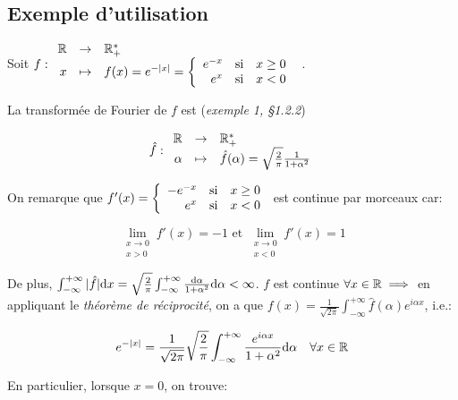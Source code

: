 \subsection{Exemple d'utilisation}

\begin{example}
    Soit $
    f:
    \begin{array}{r c l}
    \mathbb{R} & \rightarrow & \mathbb{R}_+^* \\
    x  & \mapsto & f(x) = e^{-|x|} =
    \left \{
    \begin{array}{r c l}
    e^{-x} & \textrm{si} & x \geq 0 \\
    e^x    & \textrm{si} & x < 0
    \end{array}
    \right.
    \end{array}
    $.
    
    La transformée de Fourier de $f$ est (\textit{exemple 1, §1.2.2})
    
    \[
    \hat{f}:
    \begin{array}{r c l}
    \mathbb{R} & \rightarrow & \mathbb{R}_+^* \\
    \alpha & \mapsto & \hat{f}(\alpha) =
    \sqrt{\frac{2}{\pi}} \frac{1}{1 + \alpha^2}
    \end{array}
    \]

    On remarque que $f'(x) =
    \left\{
    \begin{array}{r c l}
    -e^{-x} & \textrm{si} & x \geq 0 \\
    e^x    & \textrm{si} & x < 0
    \end{array}
    \right.$
    est continue par morceaux car:
    
    \[\lim\limits_{\substack{x \rightarrow 0 \\ x > 0}} f'(x) = -1 \textrm{ et } \lim\limits_{\substack{x \rightarrow 0 \\ x < 0}} f'(x) = 1\]
    
    De plus, $\int_{-\infty}^{+\infty} |\hat{f}|\mathrm{d}x = \sqrt{\frac{2}{\pi}} \int_{-\infty}^{+\infty} \frac{\mathrm{d}\alpha}{1 + \alpha^2} \mathrm{d}\alpha < \infty$.
    $f$ est continue $\forall x \in \mathbb{R} \implies$ en appliquant le \textit{théorème de réciprocité}, on a que $f(x) = \frac{1}{\sqrt{2 \pi}} \int_{-\infty}^{+\infty} \hat{f}(\alpha) e^{i\alpha x}$, i.e.:
    
    \[
    e^{-|x|} =
    \frac{1}{\sqrt{2 \pi}} \sqrt{\frac{2}{\pi}} \int_{-\infty}^{+\infty} \frac{e^{i\alpha x}}{1 + \alpha^2}\mathrm{d}\alpha
    \quad \forall x \in \mathbb{R}
    \]
    
    En particulier, lorsque $x = 0$, on trouve:
    

\end{example}
